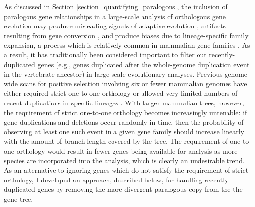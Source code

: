 As discussed in Section \ref{section_quantifying_paralogous}, the
inclusion of paralogous gene relationships in a large-scale analysis
of orthologous gene evolution may produce misleading signals of
adaptive evolution \citep{Lynch2000}, artifacts resulting from gene
conversion \citep{TODO}, and produce biases due to lineage-specific
family expansion, a process which is relatively common in mammalian
gene families \citep{TODO}. As a result, it has traditionally been
considered important to filter out recently-duplicated genes (e.g.,
genes duplicated after the whole-genome duplication event in the
vertebrate ancestor) in large-scale evolutionary analyses. Previous
genome-wide scans for positive selection involving six or fewer
mammalian genomes have either required strict one-to-one orthology
\citep{Clark2003,Nielsen2005} or allowed very limited numbers of
recent duplications in specific lineages \citep{Kosiol2008}. With
larger mammalian trees, however, the requirement of strict one-to-one
orthology becomes increasingly untenable: if gene duplications and
deletions occur randomly in time, then the probability of observing at
least one such event in a given gene family should increase linearly
with the amount of branch length covered by the tree. The requirement
of one-to-one orthology would result in fewer genes being available
for analysis as more species are incorporated into the analysis, which
is clearly an undesirable trend. As an alternative to ignoring genes
which do not satisfy the requirement of strict orthology, I developed
an approach, described below, for handling recently duplicated genes
by removing the more-divergent paralogous copy from the the gene tree.

